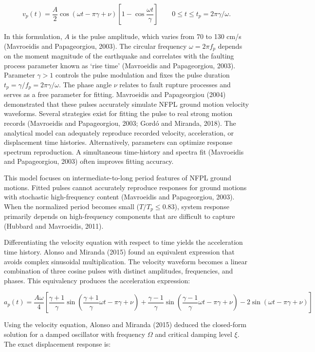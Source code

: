 \[v_p(t) = \frac{A}{2}\cos(\omega t - \pi\gamma + \nu)\left[ 1 - \cos\frac{\omega t}{\gamma} \right]\qquad 0 \leq t \leq t_p = 2\pi\gamma/\omega.\]

In this formulation, \(A\) is the pulse amplitude, which varies from 70
to 130 cm/s (Mavroeidis and Papageorgiou, 2003). The circular frequency
\(\omega = 2\pi f_p\) depends on the moment magnitude of the earthquake
and correlates with the faulting process parameter known as `rise time'
(Mavroeidis and Papageorgiou, 2003). Parameter \(\gamma > 1\) controls
the pulse modulation and fixes the pulse duration
\(t_p = \gamma / f_p = 2\pi\gamma / \omega\). The phase angle \(\nu\)
relates to fault rupture processes and serves as a free parameter for
fitting. Mavroeidis and Papageorgiou (2004) demonstrated that these
pulses accurately simulate NFPL ground motion velocity waveforms.
Several strategies exist for fitting the pulse to real strong motion
records (Mavroeidis and Papageorgiou, 2003; Gordó and Miranda, 2018).
The analytical model can adequately reproduce recorded velocity,
acceleration, or displacement time histories. Alternatively, parameters
can optimize response spectrum reproduction. A simultaneous time-history
and spectra fit (Mavroeidis and Papageorgiou, 2003) often improves
fitting accuracy.

This model focuses on intermediate-to-long period features of NFPL
ground motions. Fitted pulses cannot accurately reproduce responses for
ground motions with stochastic high-frequency content (Mavroeidis and
Papageorgiou, 2003). When the normalized period becomes small
(\(T/T_p \leq 0.83\)), system response primarily depends on
high-frequency components that are difficult to capture (Hubbard and
Mavroeidis, 2011).

Differentiating the velocity equation with respect to time yields the
acceleration time history. Alonso and Miranda (2015) found an equivalent
expression that avoids complex sinusoidal multiplication. The velocity
waveform becomes a linear combination of three cosine pulses with
distinct amplitudes, frequencies, and phases. This equivalency produces
the acceleration expression:

\[a_p(t) = \frac{A\omega}{4}\left\lbrack \frac{\gamma + 1}{\gamma}\sin\left( \frac{\gamma + 1}{\gamma}\omega t - \pi\gamma + \nu \right) + \frac{\gamma - 1}{\gamma}\sin\left( \frac{\gamma - 1}{\gamma}\omega t - \pi\gamma + \nu \right) - 2\sin(\omega t - \pi\gamma + \nu) \right\rbrack\]

Using the velocity equation, Alonso and Miranda (2015) deduced the
closed-form solution for a damped oscillator with frequency \(\Omega\)
and critical damping level \(\xi\). The exact displacement response is:

